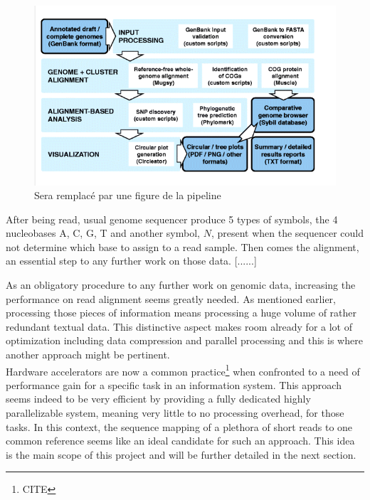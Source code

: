 \begin{minipage}[t]{0.60\textwidth}
\begin{figure}[H]
    \centering
    \includegraphics[scale = 0.4]{Figures/pipeline.png}
    \caption{Sera remplacé par une figure de la pipeline}
    \label{fig:analysispipe}
\end{figure}
\end{minipage}
\begin{minipage}[t]{0.350\textwidth}
After being read, usual genome sequencer produce 5 types of symbols, the 4 nucleobases A, C, G, T and another symbol, $N$, present when the sequencer could not determine which base to assign to a read sample. Then comes the alignment, an essential step to any further work on those data. [......]

\end{minipage}
\vspace*{5mm}
As an obligatory procedure to any further work on genomic data, increasing the performance on read alignment seems greatly needed. As mentioned earlier, processing those pieces of information means processing a huge volume of rather redundant textual data. This distinctive aspect makes room already for a lot of optimization including data compression and parallel processing and this is where another approach might be pertinent. \\

Hardware accelerators are now a common practice\footnote{CITE} when confronted to a need of performance gain for a specific task in an information system. This approach seems indeed to be very efficient by providing a fully dedicated highly parallelizable system, meaning very little to no processing overhead, for those tasks. In this context, the sequence mapping of a plethora of short reads to one common reference seems like an ideal candidate for such an approach. This idea is the main scope of this project and will be further detailed in the next section.

